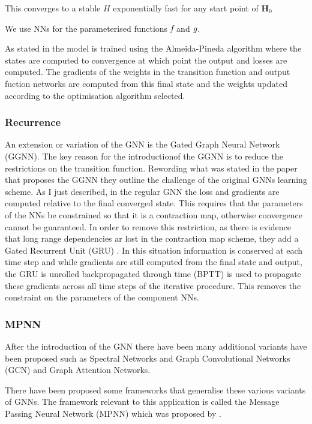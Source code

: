 \documentclass[]{../resources/final_report}
\begin{document}
This converges to a stable $H$ exponentially fast for any start point of $\textbf{H}_0$

We use NNs for the parameterised functions $\emph{f}$ and $\emph{g}$.

As stated in \cite{GGNN} the model is trained using the Almeida-Pineda algorithm \cite{Almeida}\cite{Pineda} where the states are computed to convergence at which point the output and losses are computed. The gradients of the weights in the transition function and output fuction networks are computed from this final state and the weights updated according to the optimisation algorithm selected.


\subsubsection{Recurrence}

An extension or variation of the GNN is the Gated Graph Neural Network (GGNN). The key reason for the introductionof the GGNN is to reduce the restrictions on the transition function. Rewording what was stated in \cite{GGNN} the paper that proposes the GGNN they outline the challenge of the original GNNs learning scheme. As I just described, in the regular GNN the loss and gradients are computed relative to the final converged state. This requires that the parameters of the NNs be constrained so that it is a contraction map, otherwise convergence cannot be guaranteed. In order to remove this restriction, as there is evidence that long range dependencies ar lost in the contraction map scheme, they add a Gated Recurrent Unit (GRU) \cite{GRU}. In this situation information is conserved at each time step and while gradients are still computed from the final state and output, the GRU is unrolled backpropagated through time (BPTT) \cite{Pineda} is used to propagate these gradients across all time steps of the iterative procedure. This removes the constraint on the parameters of the component NNs.


\subsubsection{MPNN}

After the introduction of the GNN there have been many additional variants have been proposed such as Spectral Networks and Graph Convolutional Networks (GCN) and Graph Attention Networks.

There have been proposed some frameworks that generalise these various variants of GNNs. The framework relevant to this application is called the Message Passing Neural Network (MPNN) which was proposed by \cite{mpnn}.
\end{document}
